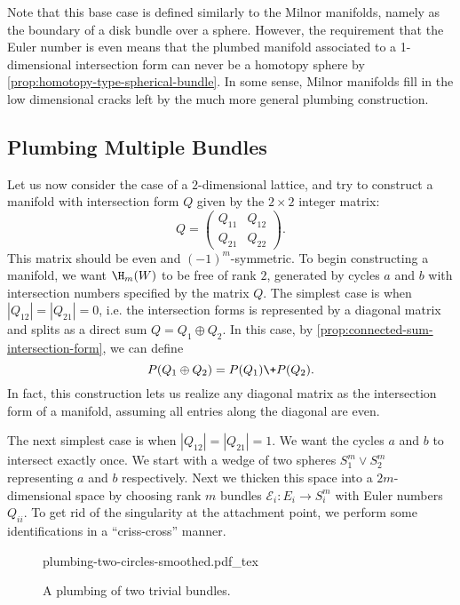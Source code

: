 \begin{remark}
	Note that this base case is defined similarly to the Milnor manifolds, namely as the boundary of a disk bundle over a sphere. However, the requirement that the Euler number is even means that the plumbed manifold associated to a 1-dimensional intersection form can never be a homotopy sphere by \cref{prop:homotopy-type-spherical-bundle}. In some sense, Milnor manifolds fill in the low dimensional cracks left by the much more general plumbing construction.
\end{remark}
\subsection{Plumbing Multiple Bundles}

Let us now consider the case of a $2$-dimensional lattice, and try to construct a manifold with intersection form $Q$ given by the $2\times 2$ integer matrix:
\[
	Q = \begin{pmatrix} Q_{11} & Q_{12} \\ Q_{21} & Q_{22}\end{pmatrix}.
\]
This matrix should be even and $(-1)^m$-symmetric. To begin constructing a manifold, we want $\H_m(W)$ to be free of rank $2$, generated by cycles $a$ and $b$ with intersection numbers specified by the matrix $Q$.
The simplest case is when $|Q_{12}|=|Q_{21}|=0$, i.e. the intersection forms is represented by a diagonal matrix and splits as a direct sum $Q=Q_1\oplus Q_2$. In this case, by \cref{prop:connected-sum-intersection-form}, we can define
\[
	P(Q_1\oplus Q_2) = P(Q_1)\+ P(Q_2).
\]
In fact, this construction lets us realize any diagonal matrix as the intersection form of a manifold, assuming all entries along the diagonal are even.

The next simplest case is when $|Q_{12}|=|Q_{21}|=1$. We want the cycles $a$ and $b$ to intersect exactly once. We start with a wedge of two spheres $S^m_1\vee S^m_2$ representing $a$ and $b$ respectively. Next we thicken this space into a $2m$-dimensional space by choosing rank $m$ bundles $\mathcal{E}_i : E_i \to S^m_i$ with Euler numbers $Q_{ii}$. To get rid of the singularity at the attachment point, we perform some identifications in a ``criss-cross'' manner.

\begin{figure}[ht]
	\centering
	{plumbing-two-circles-smoothed.pdf_tex}
	\caption{A plumbing of two trivial bundles.}\label{fig:plumbing-two-circles}
\end{figure}

